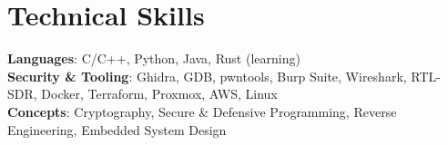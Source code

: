 \section{Technical Skills}
    \begin{itemize}[leftmargin=0.15in, label={}]
	\small{\item{
		\textbf{Languages}{: C/C++, Python, Java, Rust (learning)} \\
		\textbf{Security \& Tooling}{: Ghidra, GDB, pwntools, Burp Suite, Wireshark, RTL-SDR, Docker, Terraform, Proxmox, AWS, Linux} \\
		\textbf{Concepts}{: Cryptography, Secure \& Defensive Programming, Reverse Engineering, Embedded System Design}
	}}
    \end{itemize}\vspace{-16pt}

